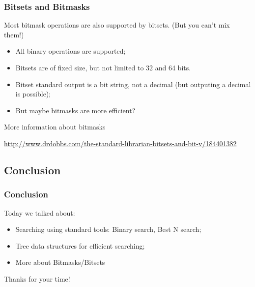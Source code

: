\documentclass{beamer}
\begin{document}
\begin{frame}
  \frametitle{Bitsets and Bitmasks}

  {\smaller
  Most bitmask operations are also supported by bitsets. (But you can't mix them!)

  \begin{itemize}
  \item All binary operations are supported;
  \item Bitsets are of fixed size, but not limited to 32 and 64 bits.
  \item Bitset standard output is a bit string, not a decimal (but
    outputing a decimal is possible);
  \item But maybe bitmasks are more efficient?
  \end{itemize}
  
  More information about bitmasks 

  \url{http://www.drdobbs.com/the-standard-librarian-bitsets-and-bit-v/184401382}
  }
\end{frame}

\subsection{Conclusion}
\begin{frame}
  \frametitle{Conclusion}

  Today we talked about:
  
  \begin{itemize}
  \item Searching using standard tools: Binary search, Best N search;
  \item Tree data structures for efficient searching;
  \item More about Bitmasks/Bitsets
  \end{itemize}
  
  Thanks for your time!
\end{frame}


\end{document}
